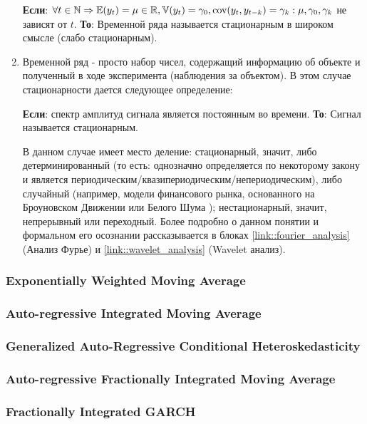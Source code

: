 \begin{enumerate}
\begin{definition}
				\textbf{Если}: $\forall t \in \mathbb{N} \Rightarrow \mathbb{E}(y_t) = \mu \in \mathbb{R}, \mathbb{V}(y_t) = \gamma_0, \text{cov}(y_t, y_{t - k}) = \gamma_k: \mu, \gamma_0, \gamma_k$ не зависят от $t$. \textbf{То}: Временной ряда называется стационарным в широком смысле (слабо стационарным).
			\end{definition}
 			\item Временной ряд - просто набор чисел, содержащий информацию об объекте и полученный в ходе эксперимента (наблюдения за объектом). В этом случае стационарности дается следующее определение:
 			\begin{definition} \label{def::signal_stationarity}
 				\textbf{Если}: спектр амплитуд сигнала является постоянным во времени. \textbf{То}: Сигнал называется стационарным.
 			\end{definition}
 			В данном случае имеет место деление: стационарный, значит, либо детерминированный (то есть: однозначно определяется по некоторому закону и является периодическим/квазипериодическим/непериодическим), либо случайный (например, модели финансового рынка, основанного на Броуновском Движении \cite{brownian_motion_for_stochastic_differential_equation} или Белого Шума \cite{white_noise_for_stochastic_differential_equation}); нестационарный, значит, непрерывный или переходный. Более подробно о данном понятии и формальном его осознании рассказывается в блоках \ref{link::fourier_analysis} (Анализ Фурье) и \ref{link::wavelet_analysis} (Wavelet анализ).
		\end{enumerate}
		\subsubsection{Exponentially Weighted Moving Average}
		\subsubsection{Auto-regressive Integrated Moving Average}
		\subsubsection{Generalized Auto-Regressive Conditional Heteroskedasticity}
		\subsubsection{Auto-regressive Fractionally Integrated Moving Average}
		\subsubsection{Fractionally Integrated GARCH}
